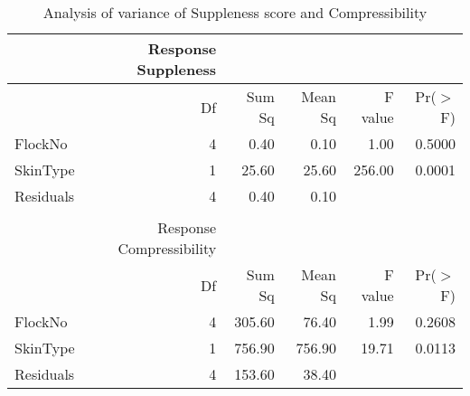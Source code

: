 \begin{table}[ht]
\centering
\caption{Analysis of variance of Suppleness score and Compressibility}
\label{tab:macrot1aov}
\vspace{0.1in}

\begin{tabular}{lrrrrr}
 & Response Suppleness & & & \\
  \hline
 & Df & Sum Sq & Mean Sq & F value & Pr($>$F) \\ 
  \hline
FlockNo     & 4 & 0.40 & 0.10 & 1.00 & 0.5000 \\
  SkinType    & 1 & 25.60 & 25.60 & 256.00 & 0.0001 \\
  Residuals   & 4 & 0.40 & 0.10 &  &  \\ 
   \hline
\\
 & Response Compressibility & & & \\
  \hline
 & Df & Sum Sq & Mean Sq & F value & Pr($>$F) \\ 
  \hline
FlockNo     & 4 & 305.60 & 76.40 & 1.99 & 0.2608 \\
  SkinType    & 1 & 756.90 & 756.90 & 19.71 & 0.0113 \\
  Residuals   & 4 & 153.60 & 38.40 &  &  \\
   \hline
\end{tabular}
\end{table}

